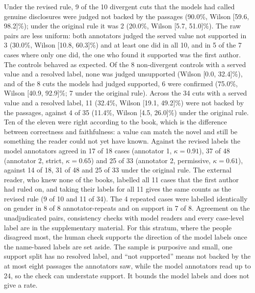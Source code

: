 \documentclass[sn-mathphys]{sn-jnl}%
\theoremstyle{thmstyleone}%
\theoremstyle{thmstyletwo}%
\theoremstyle{thmstylethree}%
\begin{document}
Under the revised rule, 9 of the 10 divergent cuts that the models had called genuine disclosures were judged not backed by the passages (90.0\%, Wilson [59.6, 98.2]\%); under the original rule it was 2 (20.0\%, Wilson [5.7, 51.0]\%). The raw pairs are less uniform: both annotators judged the served value not supported in 3 (30.0\%, Wilson [10.8, 60.3]\%) and at least one did in all 10, and in 5 of the 7 cases where only one did, the one who found it supported was the first author. The controls behaved as expected. Of the 8 non-divergent controls with a served value and a resolved label, none was judged unsupported (Wilson [0.0, 32.4]\%), and of the 8 cuts the models had judged supported, 6 were confirmed (75.0\%, Wilson [40.9, 92.9]\%; 7 under the original rule). Across the 34 cuts with a served value and a resolved label, 11 (32.4\%, Wilson [19.1, 49.2]\%) were not backed by the passages, against 4 of 35 (11.4\%, Wilson [4.5, 26.0]\%) under the original rule. Ten of the eleven were right according to the book, which is the difference between correctness and faithfulness: a value can match the novel and still be something the reader could not yet have known. Against the revised labels the model annotators agreed in 17 of 18 cases (annotator 1, $\kappa=0.91$), 37 of 48 (annotator 2, strict, $\kappa=0.65$) and 25 of 33 (annotator 2, permissive, $\kappa=0.61$), against 14 of 18, 31 of 48 and 25 of 33 under the original rule. The external reader, who knew none of the books, labelled all 11 cases that the first author had ruled on, and taking their labels for all 11 gives the same counts as the revised rule (9 of 10 and 11 of 34). The 4 repeated cases were labelled identically on gender in 8 of 8 annotator-repeats and on support in 7 of 8. Agreement on the unadjudicated pairs, consistency checks with model readers and every case-level label are in the supplementary material. For this stratum, where the people disagreed most, the human check supports the direction of the model labels once the name-based labels are set aside. The sample is purposive and small, one support split has no resolved label, and ``not supported'' means not backed by the at most eight passages the annotators saw, while the model annotators read up to 24, so the check can understate support. It bounds the model labels and does not give a rate.
\end{document}
